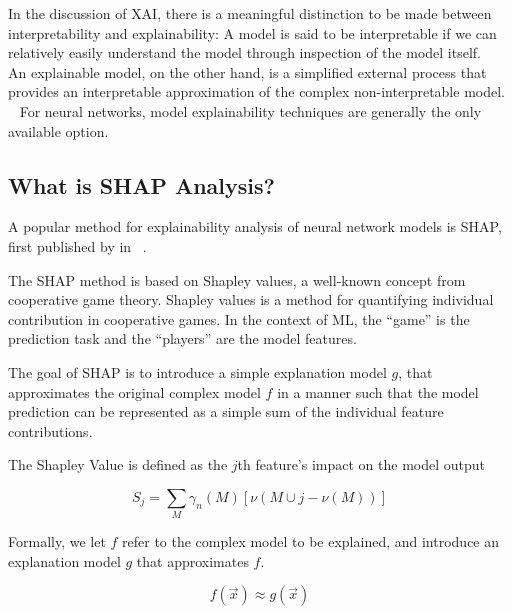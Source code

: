 In the discussion of \Ac{XAI}, there is 
a meaningful distinction to be made between 
interpretability and explainability:
A model is said to be interpretable if we can 
relatively easily understand the model through inspection
of the model itself.
~\autocite{russellArtificial2009}
An explainable model, on the other hand, is a simplified 
external process that provides an interpretable approximation
of the complex non-interpretable model.
~\autocite{lundbergUnified2017}
For neural networks,
model explainability techniques are generally 
the only available option.

\subsection{What is SHAP Analysis?} 

A popular method for explainability analysis of neural network models
is \ac{SHAP}, first published by
\citeauthor{lundbergUnified2017} in \citeyear{lundbergUnified2017}
~\autocite{lundbergUnified2017}.

The \ac{SHAP} method is based on Shapley values,
a well-known concept from cooperative game theory.
Shapley values is a method for quantifying individual contribution
in cooperative games.
In the context of \ac{ML}, the \enquote{game} is the prediction task
and the \enquote{players} are the model features.



The goal of \ac{SHAP} is to introduce a simple explanation model \(g\),
that approximates the original complex model \(f\) in a manner
such that the model prediction can be represented as a simple sum
of the individual feature contributions.




The Shapley Value is defined as the \(j\)th feature's 
impact on the model output

\begin{equation}
    S_j = \sum_{M} \gamma_n (M) \left[
        \nu (M \cup {j} - \nu (M))
    \right]
\end{equation}








Formally, we let \(f\) refer to the complex model to be explained, 
and introduce an explanation model \(g\) that approximates \(f\).



\begin{equation}
    f(\vec{x}) \approx g(\vec{x})
\end{equation}

